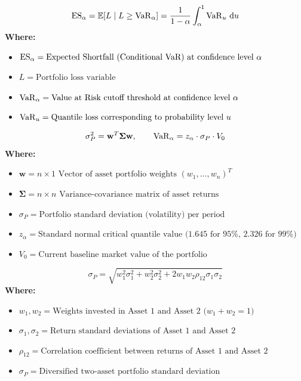 \begin{formulabox}
\begin{equation}
\operatorname{ES}_\alpha = \mathbb{E}[L \mid L \ge \operatorname{VaR}_\alpha] = \frac{1}{1 - \alpha} \int_{\alpha}^1 \operatorname{VaR}_u \, \mathrm{d} u
\end{equation}
\textbf{Where:}
\begin{itemize}[noitemsep, topsep=2pt]
    \item $\operatorname{ES}_\alpha = \text{Expected Shortfall (Conditional VaR) at confidence level } \alpha$
    \item $L = \text{Portfolio loss variable}$
    \item $\operatorname{VaR}_\alpha = \text{Value at Risk cutoff threshold at confidence level } \alpha$
    \item $\operatorname{VaR}_u = \text{Quantile loss corresponding to probability level } u$
\end{itemize}
\end{formulabox}

\begin{formulabox}
\begin{equation}
\sigma_P^2 = \mathbf{w}^T \boldsymbol{\Sigma} \mathbf{w}, \qquad \operatorname{VaR}_\alpha = z_\alpha \cdot \sigma_P \cdot V_0
\end{equation}
\textbf{Where:}
\begin{itemize}[noitemsep, topsep=2pt]
    \item $\mathbf{w} = n \times 1 \text{ Vector of asset portfolio weights } (w_1, \dots, w_n)^T$
    \item $\boldsymbol{\Sigma} = n \times n \text{ Variance-covariance matrix of asset returns}$
    \item $\sigma_P = \text{Portfolio standard deviation (volatility) per period}$
    \item $z_\alpha = \text{Standard normal critical quantile value (1.645 for 95\%, 2.326 for 99\%)}$
    \item $V_0 = \text{Current baseline market value of the portfolio}$
\end{itemize}
\end{formulabox}

\begin{formulabox}
\begin{equation}
\sigma_P = \sqrt{w_1^2 \sigma_1^2 + w_2^2 \sigma_2^2 + 2 w_1 w_2 \rho_{12} \sigma_1 \sigma_2}
\end{equation}
\textbf{Where:}
\begin{itemize}[noitemsep, topsep=2pt]
    \item $w_1, w_2 = \text{Weights invested in Asset 1 and Asset 2 ($w_1 + w_2 = 1$)}$
    \item $\sigma_1, \sigma_2 = \text{Return standard deviations of Asset 1 and Asset 2}$
    \item $\rho_{12} = \text{Correlation coefficient between returns of Asset 1 and Asset 2}$
    \item $\sigma_P = \text{Diversified two-asset portfolio standard deviation}$
\end{itemize}
\end{formulabox}

